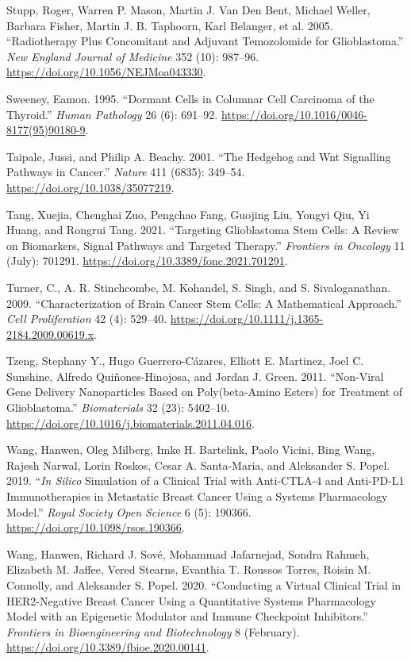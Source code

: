\documentclass[
  letterpaper,
]{scrreprt}
\newlength{\cslhangindent}
\newenvironment{CSLReferences}[2] %
 {\begin{list}{}{%
  \setlength{\itemindent}{0pt}
  \setlength{\leftmargin}{0pt}
  \setlength{\parsep}{0pt}
  \ifodd #1
   \setlength{\leftmargin}{\cslhangindent}
   \setlength{\itemindent}{-1\cslhangindent}
  \fi
  \setlength{\itemsep}{#2\baselineskip}}}
 {\end{list}}
\theoremstyle{definition}
\theoremstyle{remark}
\begin{document}
\begin{CSLReferences}{1}{0}
Stupp, Roger, Warren P. Mason, Martin J. Van Den Bent, Michael Weller,
Barbara Fisher, Martin J. B. Taphoorn, Karl Belanger, et al. 2005.
{``Radiotherapy Plus Concomitant and Adjuvant Temozolomide for
Glioblastoma.''} \emph{New England Journal of Medicine} 352 (10):
987--96. \url{https://doi.org/10.1056/NEJMoa043330}.

Sweeney, Eamon. 1995. {``Dormant Cells in Columnar Cell Carcinoma of the
Thyroid.''} \emph{Human Pathology} 26 (6): 691--92.
\url{https://doi.org/10.1016/0046-8177(95)90180-9}.

Taipale, Jussi, and Philip A. Beachy. 2001. {``The Hedgehog and Wnt
Signalling Pathways in Cancer.''} \emph{Nature} 411 (6835): 349--54.
\url{https://doi.org/10.1038/35077219}.

Tang, Xuejia, Chenghai Zuo, Pengchao Fang, Guojing Liu, Yongyi Qiu, Yi
Huang, and Rongrui Tang. 2021. {``Targeting Glioblastoma Stem Cells: A
Review on Biomarkers, Signal Pathways and Targeted Therapy.''}
\emph{Frontiers in Oncology} 11 (July): 701291.
\url{https://doi.org/10.3389/fonc.2021.701291}.

Turner, C., A. R. Stinchcombe, M. Kohandel, S. Singh, and S.
Sivaloganathan. 2009. {``Characterization of Brain Cancer Stem Cells: A
Mathematical Approach.''} \emph{Cell Proliferation} 42 (4): 529--40.
\url{https://doi.org/10.1111/j.1365-2184.2009.00619.x}.

Tzeng, Stephany Y., Hugo Guerrero-Cázares, Elliott E. Martinez, Joel C.
Sunshine, Alfredo Quiñones-Hinojosa, and Jordan J. Green. 2011.
{``Non-Viral Gene Delivery Nanoparticles Based on Poly(beta-Amino
Esters) for Treatment of Glioblastoma.''} \emph{Biomaterials} 32 (23):
5402--10. \url{https://doi.org/10.1016/j.biomaterials.2011.04.016}.

Wang, Hanwen, Oleg Milberg, Imke H. Bartelink, Paolo Vicini, Bing Wang,
Rajesh Narwal, Lorin Roskos, Cesar A. Santa-Maria, and Aleksander S.
Popel. 2019. {``{\emph{In Silico}} Simulation of a Clinical Trial with
Anti-CTLA-4 and Anti-PD-L1 Immunotherapies in Metastatic Breast Cancer
Using a Systems Pharmacology Model.''} \emph{Royal Society Open Science}
6 (5): 190366. \url{https://doi.org/10.1098/rsos.190366}.

Wang, Hanwen, Richard J. Sové, Mohammad Jafarnejad, Sondra Rahmeh,
Elizabeth M. Jaffee, Vered Stearns, Evanthia T. Roussos Torres, Roisin
M. Connolly, and Aleksander S. Popel. 2020. {``Conducting a Virtual
Clinical Trial in HER2-Negative Breast Cancer Using a Quantitative
Systems Pharmacology Model with an Epigenetic Modulator and Immune
Checkpoint Inhibitors.''} \emph{Frontiers in Bioengineering and
Biotechnology} 8 (February).
\url{https://doi.org/10.3389/fbioe.2020.00141}.


\end{CSLReferences}
\end{document}
